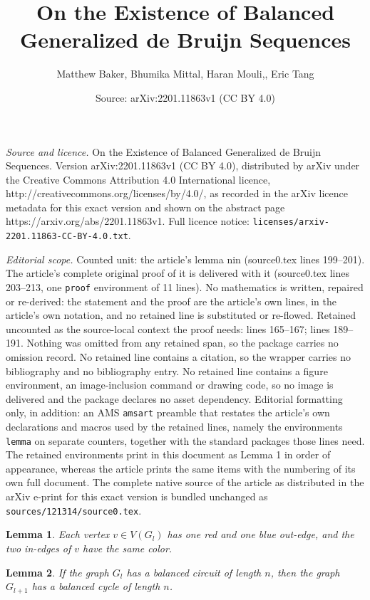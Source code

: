 \documentclass[10pt,a4paper]{amsart}
\title{On the Existence of Balanced Generalized de Bruijn Sequences}
\author{Matthew Baker, Bhumika Mittal, Haran Mouli,, Eric Tang}
\date{Source: arXiv:2201.11863v1 (CC BY 4.0)}
\newtheorem{lemma}{Lemma}
\begin{document}
\maketitle

\noindent\emph{Source and licence.} On the Existence of Balanced Generalized de Bruijn Sequences. Version arXiv:2201.11863v1 (CC BY 4.0), distributed by arXiv under the Creative Commons Attribution 4.0 International licence, http://creativecommons.org/licenses/by/4.0/, as recorded in the arXiv licence metadata for this exact version and shown on the abstract page https://arxiv.org/abs/2201.11863v1. Full licence notice: \texttt{licenses/arxiv-2201.11863-CC-BY-4.0.txt}.\par\smallskip

\noindent\textit{Editorial scope.} Counted unit: the article's lemma nin (source0.tex lines 199--201). The article's complete original proof of it is delivered with it (source0.tex lines 203--213, one \texttt{proof} environment of 11 lines). No mathematics is written, repaired or re-derived: the statement and the proof are the article's own lines, in the article's own notation, and no retained line is substituted or re-flowed.  Retained uncounted as the source-local context the proof needs: lines 165--167; lines 189--191.  Nothing was omitted from any retained span, so the package carries no omission record.  No retained line contains a citation, so the wrapper carries no bibliography and no bibliography entry.  No retained line contains a figure environment, an image-inclusion command or drawing code, so no image is delivered and the package declares no asset dependency.  Editorial formatting only, in addition: an AMS \texttt{amsart} preamble that restates the article's own declarations and macros used by the retained lines, namely the environments \texttt{lemma} on separate counters, together with the standard packages those lines need.  The retained environments print in this document as Lemma 1 in order of appearance, whereas the article prints the same items with the numbering of its own full document.  The complete native source of the article as distributed in the arXiv e-print for this exact version is bundled unchanged as \texttt{sources/121314/source0.tex}.
\begin{lemma}\label{redblue}
Each vertex $v \in V(G_l)$ has one red and one blue out-edge, and the two in-edges of $v$ have the same color.
\end{lemma}

\begin{lemma}\label{cycle}
If the graph $G_l$ has a balanced circuit of length $n$, then the graph $G_{l+1}$ has a balanced cycle of length $n$.
\end{lemma}
\end{document}
